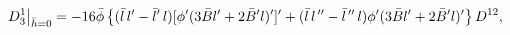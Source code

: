 \begin{equation*}
\left. D_{3}^{1}\right| _{\bar{h}=0}=-16\bar{\phi}\left\{ (\bar{l}%
\,l^{\prime }-\bar{l}^{\prime }\,l)[\phi ^{\prime }(3\bar{B}l^{\prime }+2%
\bar{B}^{\prime }l)^{\prime }]^{\prime }+(\bar{l}\,l^{\,\prime \prime }-\bar{%
l}^{\,\prime \prime }\,l)\phi ^{\prime }(3\bar{B}l^{\prime }+2\bar{B}%
^{\prime }l)^{\prime }\right\} D^{12},
\end{equation*}


